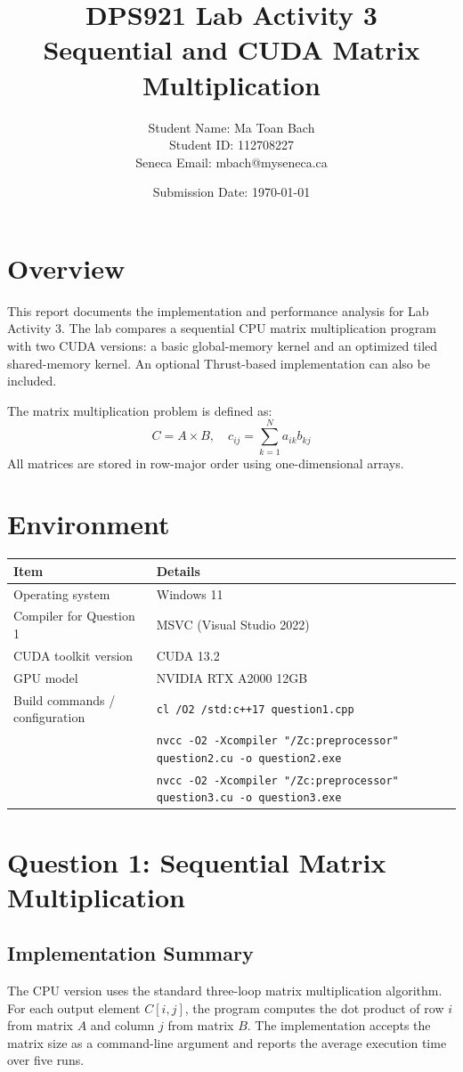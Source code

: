 \documentclass[11pt]{article}
\title{DPS921 Lab Activity 3\\Sequential and CUDA Matrix Multiplication}
\author{Student Name: Ma Toan Bach\\Student ID: 112708227\\Seneca Email: mbach@myseneca.ca}
\date{Submission Date: \today}
\begin{document}
\maketitle

\section{Overview}
This report documents the implementation and performance analysis for Lab Activity 3. The lab compares a sequential CPU matrix multiplication program with two CUDA versions: a basic global-memory kernel and an optimized tiled shared-memory kernel. An optional Thrust-based implementation can also be included.

The matrix multiplication problem is defined as:
\[
C = A \times B, \quad c_{ij} = \sum_{k=1}^{N} a_{ik} b_{kj}
\]
All matrices are stored in row-major order using one-dimensional arrays.

\section{Environment}
\begin{tabularx}{\textwidth}{@{}lX@{}}
\toprule
Item & Details \\
\midrule
Operating system & Windows 11 \\
Compiler for Question 1 & MSVC (Visual Studio 2022) \\
CUDA toolkit version & CUDA 13.2 \\
GPU model & NVIDIA RTX A2000 12GB \\
Build commands / configuration & \small\texttt{cl /O2 /std:c++17 question1.cpp} \\
& \small\texttt{nvcc -O2 -Xcompiler "/Zc:preprocessor" question2.cu -o question2.exe} \\
& \small\texttt{nvcc -O2 -Xcompiler "/Zc:preprocessor" question3.cu -o question3.exe} \\
\bottomrule
\end{tabularx}

\section{Question 1: Sequential Matrix Multiplication}
\subsection{Implementation Summary}
The CPU version uses the standard three-loop matrix multiplication algorithm. For each output element \(C[i,j]\), the program computes the dot product of row \(i\) from matrix \(A\) and column \(j\) from matrix \(B\). The implementation accepts the matrix size as a command-line argument and reports the average execution time over five runs.
\end{document}
